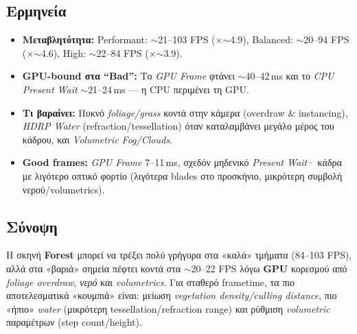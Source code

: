 \begin{table}[H]
  \noindent
\end{table}

\subsection*{Ερμηνεία}
\begin{itemize}
  \item \textbf{Μεταβλητότητα:} 
  Performant: \(\sim\)21–103 FPS (×\(\sim\)4.9), 
  Balanced: \(\sim\)20–94 FPS (×\(\sim\)4.6),
  High: \(\sim\)22–84 FPS (×\(\sim\)3.9).
  \item \textbf{GPU-bound στα “Bad”:} Το \emph{GPU Frame} φτάνει \(\sim\)40–42\,ms και το \emph{CPU Present Wait} \(\sim\)21–24\,ms — η CPU περιμένει τη GPU.
  \item \textbf{Τι βαραίνει:} Πυκνό \emph{foliage/grass} κοντά στην κάμερα (overdraw \& instancing), \emph{HDRP Water} (refraction/tessellation) όταν καταλαμβάνει μεγάλο μέρος του κάδρου, και \emph{Volumetric Fog/Clouds}.
  \item \textbf{Good frames:} \emph{GPU Frame} 7–11\,ms, σχεδόν μηδενικό \emph{Present Wait}· κάδρα με λιγότερο οπτικό φορτίο (λιγότερα blades στο προσκήνιο, μικρότερη συμβολή νερού/volumetrics).
\end{itemize}

\subsection*{Σύνοψη}
Η σκηνή \textbf{Forest} μπορεί να τρέξει πολύ γρήγορα στα «καλά» τμήματα (84–103 FPS), αλλά στα «βαριά» σημεία πέφτει κοντά στα \(\sim\)20–22 FPS λόγω \textbf{GPU} κορεσμού από \emph{foliage overdraw}, \emph{νερό} και \emph{volumetrics}. Για σταθερό frametime, τα πιο αποτελεσματικά «κουμπιά» είναι: μείωση \emph{vegetation density/culling distance}, πιο «ήπιο» \emph{water} (μικρότερη tessellation/refraction range) και ρύθμιση \emph{volumetric} παραμέτρων (step count/height).


